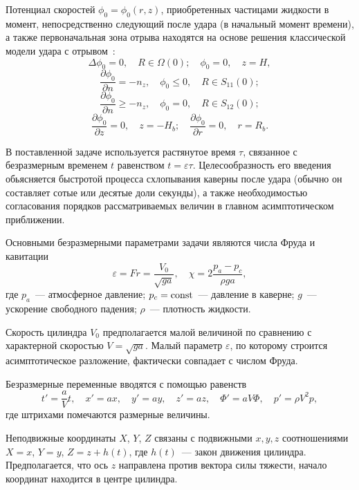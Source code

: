 \documentclass[press]{vestnik}
\begin{document}
Потенциал скоростей $\phi_{0} =\phi_{0} (r,z)$, приобретенных частицами 
жидкости в момент, непосредственно следующий после удара (в начальный момент 
времени), а также первоначальная зона отрыва находятся на основе решения 
классической модели удара с отрывом~\cite{B01}: 
\begin{equation}\label{1.9}
\Delta \phi_{0} =0,
\quad
R\in \Omega (0);
\quad
\phi_{0} =0,
\quad
z=H,
\end{equation}
\begin{equation}\label{1.10}
\frac{\partial \phi_{0} }{\partial n}=-n_{z} ,
\quad
\phi_{0} \leqslant 0,
\quad
R\in S_{11} (0);
\end{equation}
\begin{equation}\label{1.11}
\frac{\partial \phi_{0} }{\partial n}\geqslant -n_{z} ,
\quad
\phi_{0} =0,
\quad
R\in S_{12} (0); 
\end{equation}
\begin{equation}\label{1.12}
\frac{\partial \phi_{0} }{\partial z}=0,
\quad
z=-H_{b} ;
\quad
\frac{\partial \phi_{0} }{\partial r}=0,
\quad
r=R_{b}.
\end{equation}

В поставленной задаче используется растянутое время $\tau $, связанное с 
безразмерным временем $t$ равенством $t=\varepsilon \tau $. Целесообразность 
его введения обьясняется быстротой процесса схлопывания каверны после удара 
(обычно он составляет сотые или десятые доли секунды), а также 
необходимостью согласования порядков рассматриваемых величин в главном 
асимптотическом приближении. 

Основными безразмерными параметрами задачи являются числа Фруда и 
кавитации
\[
\varepsilon =Fr=\frac{V_{0} }{\sqrt {ga} },
\quad
\chi =2\frac{p_{a} -p_{c} }{\rho ga},
\]
где $p_{a} $~--- атмосферное давление; $p_{c} =\mathrm{const}$~--- давление в 
каверне; $g$~--- ускорение свободного падения; $\rho $~--- плотность жидкости. 

Скорость цилиндра $V_{0} $ предполагается малой величиной по сравнению с 
характерной скоростью $V=\sqrt {ga} $. Малый параметр $\varepsilon $, по 
которому строится асимптотическое разложение, фактически совпадает с числом 
Фруда.

Безразмерные переменные вводятся с помощью равенств
\[
{t}'=\frac{a}{V}t,
\quad
{x}'=ax,
\quad
{y}'=ay,
\quad
{z}'=az,
\quad
{\Phi }'=aV\Phi ,
\quad
{p}'=\rho V^{2}p,
\]
где штрихами помечаются размерные величины.

Неподвижные координаты $X$, $Y$, $Z$ связаны с подвижными $x,y,z$ соотношениями
$X=x$, $Y=y$, $Z=z+h(t)$, где $h(t)$~--- закон движения цилиндра. 
Предполагается, что ось $z$ направлена против вектора силы тяжести, начало 
координат находится в центре цилиндра. 
\end{document}
